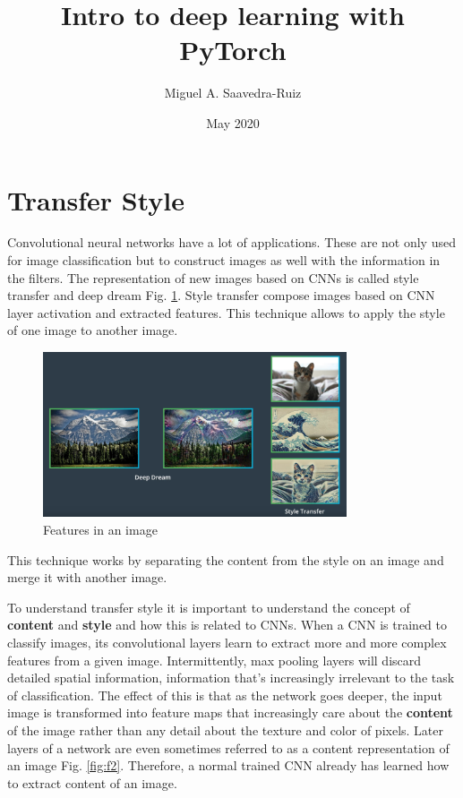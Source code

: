 \documentclass{article}
\title{Intro to deep learning with PyTorch}
\author{Miguel A. Saavedra-Ruiz}
\date{May 2020}
\begin{document}
\maketitle

\section*{Transfer Style}

Convolutional neural networks have a lot of applications. These are not only used for image classification but to construct images as well with the information in the filters. The representation of new images based on CNNs is called style transfer and deep dream Fig. \ref{fig:f1}. Style transfer compose images based on CNN layer activation and extracted features. This technique allows to apply the style of one image to another image.

\begin{figure}[ht]
    \centering
    \includegraphics[width=0.8\textwidth,height=0.8\textheight,keepaspectratio]{images/style_transfer.png}
    \captionsetup{justification=centering}
    \caption{Features in an image}
    \label{fig:f1}
\end{figure}

This technique works by separating the content from the style on an image and merge it with another image.

To understand transfer style it is important to understand the concept of \textbf{content} and \textbf{style} and how this is related to CNNs. When a CNN is trained to classify images, its convolutional layers learn to extract more and more complex features from a given image. Intermittently, max pooling layers will discard detailed spatial information, information that's increasingly irrelevant to the task of classification. The effect of this is that as the network goes deeper, the input image is transformed into feature maps that increasingly care about the \textbf{content} of the image rather than any detail about the texture and color of pixels. Later layers of a network are even sometimes referred to as a content representation of an image Fig. \ref{fig:f2}. Therefore, a normal trained CNN already has learned how to extract content of an image.
\end{document}
